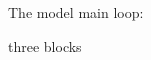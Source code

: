\documentclass[]{beamer} %
\begin{document}
\begin{frame}{}
  \centering \Large
  {The model main loop:}
  
    {three blocks}
  
\end{frame}

\end{document}
